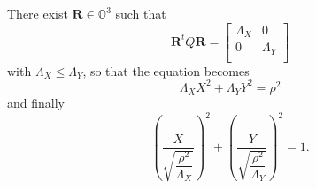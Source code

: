 \documentclass[aps]{revtex4}
\begin{document}
There exist $\bm{R}\in\mathbb{O}^3$ such that
\begin{equation}
\bm{R}^tQ\bm{R} = \begin{bmatrix}
\Lambda_X & 0 \\
0         & \Lambda_Y\\
\end{bmatrix}
\end{equation}
with $\Lambda_X\leq\Lambda_Y$, so that the equation becomes
\begin{equation}
	\Lambda_X X^2 + \Lambda_Y Y^2 = \rho^2
\end{equation}
and finally
\begin{equation}
	\left(\dfrac{X}{\sqrt{\dfrac{\rho^2}{\Lambda_X}}}\right)^2
	 + \left(\dfrac{Y}{\sqrt{\dfrac{\rho^2}{\Lambda_Y}}}\right)^2 = 1.
\end{equation}
\end{document}
